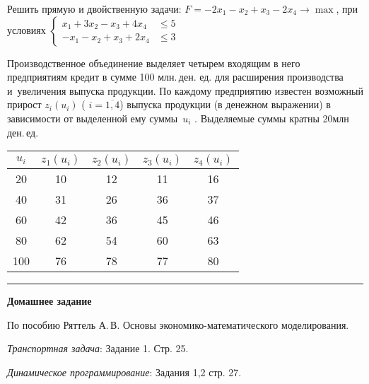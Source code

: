 \documentclass[a5paper,11pt]{extarticle}
\begin{document}
\begin{enumerate}
\item 
	Решить прямую и двойственную задачи:
	$F = -2x_1 - x_2 + x_3 -2x_4  \to \max$,  при условиях 
	$
	\left\lbrace\begin{aligned}
		x_1 + 3x_2 - x_3 + 4x_4 &\leqslant 5\\
		-x_1 - x_2 + x_3 + 2x_4 &\leqslant 3
	\end{aligned}\right.
	$

\item 
Производственное объединение выделяет четырем входящим в него
предприятиям кредит в сумме 100 млн.\,ден. ед. для расширения производства и~увеличения выпуска продукции. 
По каждому предприятию известен возможный прирост $z_i(u_i)$ ( $i = \overline{1,4}$) выпуска продукции (в денежном выражении) в зависимости от выделенной ему суммы~$u_i$ . Выделяемые суммы кратны
20\;млн\,ден.\,ед. 

{\centering
\begin{tabular}{c|cccc}
$u_i$&$z_1(u_i)$&$z_2(u_i)$&$z_3(u_i)$&$z_4(u_i)$\\
\hline
20 & 10 & 12& 11& 16\\
40 & 31 & 26& 36& 37\\
60 & 42 & 36& 45& 46\\
80 & 62 & 54& 60& 63\\
100& 76 & 78& 77& 80\\
\end{tabular}\par}
\medskip
\hrule
\medskip
{\item[] \bfseries Домашнее задание\par}
По пособию Ряттель А.\,В. Основы экономико-математического моделирования.
\item \textit{Транспортная задача}: Задание 1. Стр. 25.
\item \textit{Динамическое программирование}: Задания 1,2 стр. 27.







 





 









\end{enumerate}
\end{document}
